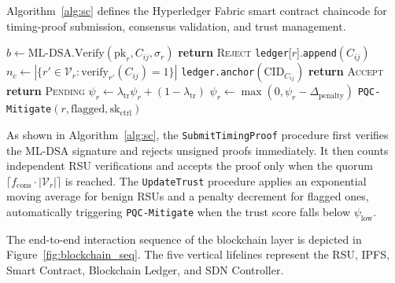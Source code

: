 Algorithm~\ref{alg:sc} defines the Hyperledger Fabric
smart contract chaincode for timing-proof submission,
consensus validation, and trust management.

\begin{algorithm}[H]
\caption{Smart Contract Trust Management (\texttt{SC-TrustMgr})}
\label{alg:sc}
\begin{algorithmic}[1]
\small
{}
  \State $b\gets\mathrm{ML\text{-}DSA.Verify}
    (\mathrm{pk}_r,C_{ij},\sigma_r)$
   \textbf{return} \textsc{Reject} \EndIf
  \State \texttt{ledger}[$r$].\texttt{append}$(C_{ij})$
  \State $n_c\gets|\{r'\in\mathcal{V}_r:
    \mathrm{verify}_{r'}(C_{ij})=1\}|$
    \State \texttt{ledger.anchor}$(\mathrm{CID}_{C_{ij}})$
    \State \textbf{return} \textsc{Accept}
  \Else\; \textbf{return} \textsc{Pending}
  \EndIf
\EndProcedure
\vspace{0.4em}
    \State $\psi_r\gets
      \lambda_{\mathrm{tr}}\psi_r+(1{-}\lambda_{\mathrm{tr}})$
  \Else
    \State $\psi_r\gets
      \max(0,\psi_r-\Delta_{\mathrm{penalty}})$
  \EndIf
    \State \texttt{PQC-Mitigate}$(r,\mathrm{flagged},
      \mathrm{sk}_{\mathrm{ctrl}})$
  \EndIf
\EndProcedure
\end{algorithmic}
\end{algorithm}

As shown in Algorithm~\ref{alg:sc}, the
\texttt{SubmitTimingProof} procedure first verifies the
ML-DSA signature and rejects unsigned proofs immediately.
It then counts independent RSU verifications and accepts
the proof only when the quorum
$\lceil f_{\mathrm{cons}} \cdot |\mathcal{V}_r| \rceil$
is reached. The \texttt{UpdateTrust} procedure applies an
exponential moving average for benign RSUs and a penalty
decrement for flagged ones, automatically triggering
\texttt{PQC-Mitigate} when the trust score falls below
$\psi_{\mathrm{low}}$.


The end-to-end interaction sequence of the blockchain layer is
depicted in Figure~\ref{fig:blockchain_seq}. The five vertical
lifelines represent the RSU, IPFS, Smart Contract, Blockchain
Ledger, and SDN Controller.

